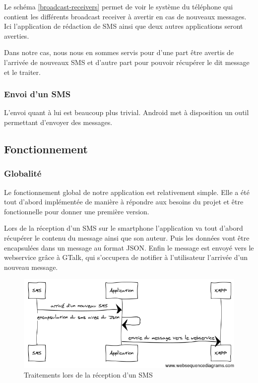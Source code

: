 Le schéma \ref{broadcast-receivers} permet de voir le système du téléphone qui contient les différents broadcast receiver à avertir en cas de nouveaux messages. Ici l'application de rédaction de SMS ainsi que deux autres 
applications seront averties.

Dans notre cas, nous nous en sommes servis pour d'une part être avertis de l'arrivée de nouveaux SMS et d'autre part pour pouvoir récupérer le dit message et le traiter.


\subsubsection{Envoi d'un SMS}

L'envoi quant à lui est beaucoup plus trivial. Android met à disposition un outil permettant d'envoyer
des messages.





\subsection{Fonctionnement}


\subsubsection{Globalité}

Le fonctionnement global de notre application est relativement simple.
Elle a été tout d'abord implémentée de manière à répondre aux besoins du projet et être fonctionnelle pour donner une première version.

Lors de la réception d'un SMS sur le smartphone l'application va tout d'abord récupérer le contenu du message ainsi que son auteur.
Puis les données vont être encapsulées dans un message au format JSON.
Enfin le message est envoyé vers le webservice grâce à GTalk, qui s'occupera de notifier à l'utilisateur l'arrivée d'un nouveau message.

\begin{figure}[!h]
  \center
  \includegraphics[width=12cm]{img/encapsulation-sms.png}
  \caption{Traitements lors de la réception d'un SMS}
  \label{encapsulation-sms}
\end{figure}

